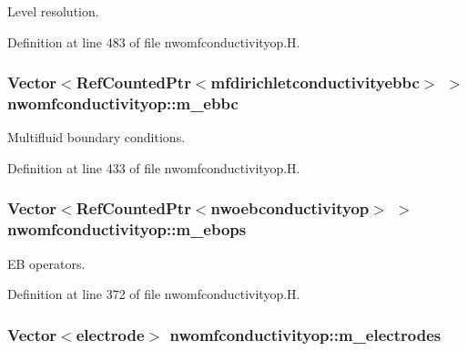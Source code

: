 Level resolution. 



Definition at line 483 of file nwomfconductivityop.\+H.

\subsubsection[{\texorpdfstring{m\+\_\+ebbc}{m_ebbc}}]{\setlength{\rightskip}{0pt plus 5cm}Vector$<$Ref\+Counted\+Ptr$<${\bf mfdirichletconductivityebbc}$>$ $>$ nwomfconductivityop\+::m\+\_\+ebbc\hspace{0.3cm}{\ttfamily [protected]}}\hypertarget{classnwomfconductivityop_aa31a3b685e2e5714a2654c3e8f192275}{}\label{classnwomfconductivityop_aa31a3b685e2e5714a2654c3e8f192275}


Multifluid boundary conditions. 



Definition at line 433 of file nwomfconductivityop.\+H.

\subsubsection[{\texorpdfstring{m\+\_\+ebops}{m_ebops}}]{\setlength{\rightskip}{0pt plus 5cm}Vector$<$Ref\+Counted\+Ptr$<${\bf nwoebconductivityop}$>$ $>$ nwomfconductivityop\+::m\+\_\+ebops\hspace{0.3cm}{\ttfamily [protected]}}\hypertarget{classnwomfconductivityop_a2e24efc817e0570afda1d8b103bddc36}{}\label{classnwomfconductivityop_a2e24efc817e0570afda1d8b103bddc36}


EB operators. 



Definition at line 372 of file nwomfconductivityop.\+H.

\subsubsection[{\texorpdfstring{m\+\_\+electrodes}{m_electrodes}}]{\setlength{\rightskip}{0pt plus 5cm}Vector$<${\bf electrode}$>$ nwomfconductivityop\+::m\+\_\+electrodes\hspace{0.3cm}{\ttfamily [protected]}}\hypertarget{classnwomfconductivityop_a8033bcd5f84abedfd4647538f3a1422f}{}\label{classnwomfconductivityop_a8033bcd5f84abedfd4647538f3a1422f}


